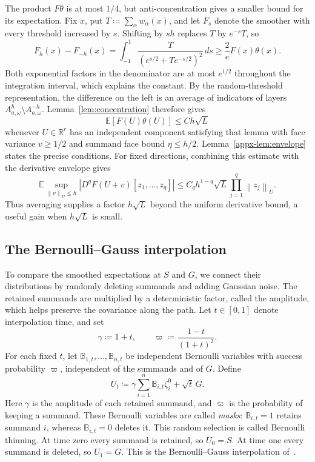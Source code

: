 \documentclass[11pt,letterpaper]{article}
\theoremstyle{remark}
\newcommand{\E}{\mathbb E}
\newcommand{\R}{\mathbb R}
\newcommand{\norm}[1]{\left\lVert#1\right\rVert}
\begin{document}
The product \(F\theta\) is at most \(1/4\), but anti-concentration
gives a smaller bound for its expectation. Fix \(x\), put
\(T\coloneqq\sum_\alpha w_\alpha(x)\), and let \(F_s\) denote
the smoother with every threshold increased by \(s\).
Shifting by \(s h\) replaces \(T\) by \(e^{-s}T\), so
\[
 F_h(x)-F_{-h}(x)
 =\int_{-1}^{1}\frac{T}{(e^{s/2}+Te^{-s/2})^2}\,ds
 \ge\frac2e F(x)\theta(x).
\]
Both exponential factors in the denominator are at most
\(e^{1/2}\) throughout the integration interval, which explains
the constant. By the random-threshold representation, the difference
on the left is an average of indicators of layers
\(A_{a,\omega}^h\setminus A_{a,\omega}^{-h}\).
Lemma~\ref{lem:concentration} therefore gives
\[
 \E[F(U)\theta(U)]\le Ch\sqrt L
\]
whenever \(U\in\R^r\) has an independent component satisfying
that lemma with face variance \(v\ge1/2\) and summand face bound
\(\eta\le h/2\). Lemma~\ref{appx-lem:envelope} states the precise
conditions. For fixed directions, combining this estimate with the
derivative envelope gives
\[
 \E\sup_{\norm v_U\le h}|D^qF(U+v)[z_1,\ldots,z_q]|
 \le C_qh^{1-q}\sqrt L\prod_{j=1}^q\norm{z_j}_U.
\]
Thus averaging supplies a factor \(h\sqrt L\) beyond the uniform
derivative bound, a useful gain when \(h\sqrt L\) is small.

\subsection{The Bernoulli--Gauss interpolation}
\label{sec:outline-path}

To compare the smoothed expectations at \(S\) and \(G\), we connect
their distributions by randomly deleting summands and adding Gaussian
noise. The retained summands are multiplied by a deterministic factor,
called the amplitude, which helps preserve the covariance along the
path. Let \(t\in[0,1]\) denote interpolation time, and set
\[
 \gamma\coloneqq 1+t,\qquad \varpi\coloneqq \frac{1-t}{(1+t)^2}.
\]
For each fixed \(t\), let \(\mathbb B_{1,t},\ldots,\mathbb B_{n,t}\)
be independent Bernoulli variables with success probability
\(\varpi\), independent of the summands and of \(G\). Define
\begin{equation}
 U_t\coloneqq\gamma\sum_{i=1}^n\mathbb B_{i,t}\zeta_i^0+\sqrt t\,G.
 \label{eq:path}
\end{equation}
Here \(\gamma\) is the amplitude of each retained summand, and
\(\varpi\) is the probability of keeping a summand. These Bernoulli
variables are called \emph{masks}: \(\mathbb B_{i,t}=1\) retains
summand \(i\), whereas \(\mathbb B_{i,t}=0\) deletes it. This random
selection is called Bernoulli thinning. At time zero every summand is retained, so
\(U_0=S\). At time one every summand is deleted, so \(U_1=G\).
This is the Bernoulli--Gauss interpolation of~\cite[Section~4]{AL}.
\end{document}
